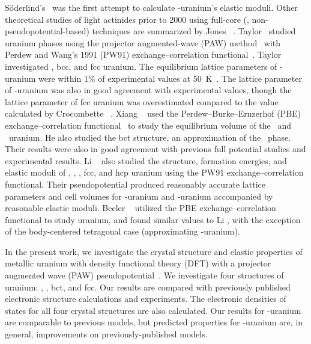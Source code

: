 S\"oderlind's~\cite{soderlind2002first} was the first attempt to calculate
\textalpha-uranium's elastic moduli. Other theoretical studies of light
actinides prior to 2000 using full-core (\ie, non-pseudopotential-based)
techniques are summarized by Jones \etal~\cite{jones2000theoretical}.
Taylor~\cite{taylor2008evaluation} studied uranium phases using the projector
augmented-wave (PAW) method~\cite{Bloechl1994} with Perdew and Wang's 1991
(PW91) exchange--correlation functional~\cite{Perdew1992a,Perdew1993}. Taylor
investigated \textalpha, bcc, and fcc uranium. The equilibrium lattice
parameters of \textalpha-uranium were within 1\% of experimental
values at 50~K~\cite{barrett1963crystal}. The lattice parameter of
\textgamma-uranium was also in good agreement with experimental values, though
the lattice parameter of fcc uranium was overestimated compared to the value
calculated by Crocombette \etal~\cite{crocombette2001plane}. Xiang
\etal~\cite{xiang2008quantum} used the Perdew--Burke--Ernzerhof (PBE) 
exchange--correlation functional~\cite{Perdew1996b,Perdew1997}
to study the equilibrium volume of the \textalpha~and \textgamma~uranium. He
also studied the bct structure, an approximation of the \textbeta~phase.
Their results were also in good agreement with previous full potential studies
and experimental results.
Li \etal~\cite{li2012structure} also studied the
structure, formation energies, and elastic moduli of \textalpha, \textbeta,
\textgamma, fcc, and hcp uranium using the PW91 exchange--correlation
functional. Their pseudopotential produced reasonably accurate lattice
parameters and cell volumes for \textgamma-uranium and \textalpha-uranium
accompanied by reasonable elastic moduli.
Beeler \etal~\cite{beeler2013first} utilized the PBE
exchange--correlation functional to study uranium, and found similar values
to Li \etal, with the exception of the body-centered tetragonal case
(approximating \textbeta-uranium).


In the present work, we investigate the crystal structure and elastic
properties of metallic uranium with density functional theory (DFT) with a
projector augmented wave (PAW) pseudopotential~\cite{Bloechl1994}. We
investigate four structures of uranium: \textalpha, \textgamma, bct, and fcc.
Our results are compared with previously published electronic structure
calculations and experiments. The electronic densities of
states for all four crystal structures are also calculated. Our results for
\textalpha-uranium are comparable to previous models, but predicted properties
for \textgamma-uranium are, in general, improvements on previously-published
models.


